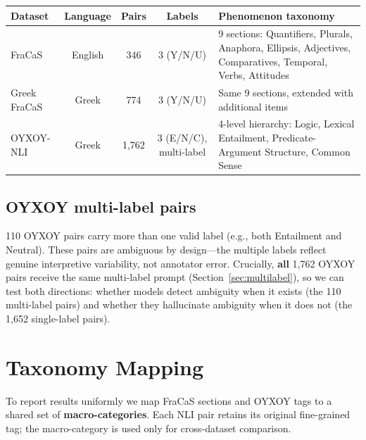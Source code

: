 \documentclass[11pt,a4paper]{article}
\begin{document}
\begin{table}[h!]
\centering\small
\begin{tabularx}{\textwidth}{l c c c X}
\toprule
\textbf{Dataset} & \textbf{Language} & \textbf{Pairs} & \textbf{Labels} & \textbf{Phenomenon taxonomy} \\
\midrule
FraCaS & English & 346 & 3 (Y/N/U) & 9 sections: Quantifiers, Plurals, Anaphora, Ellipsis, Adjectives, Comparatives, Temporal, Verbs, Attitudes \\[4pt]
Greek FraCaS & Greek & 774 & 3 (Y/N/U) & Same 9 sections, extended with additional items \\[4pt]
OYXOY-NLI & Greek & 1,762 & 3 (E/N/C), multi-label & 4-level hierarchy: Logic, Lexical Entailment, Predicate-Argument Structure, Common Sense \\
\bottomrule
\end{tabularx}
\end{table}

\subsection{OYXOY multi-label pairs}

110 OYXOY pairs carry more than one valid label (e.g., both Entailment and Neutral). These pairs are ambiguous by design---the multiple labels reflect genuine interpretive variability, not annotator error. Crucially, \textbf{all} 1,762 OYXOY pairs receive the same multi-label prompt (Section~\ref{sec:multilabel}), so we can test both directions: whether models detect ambiguity when it exists (the 110 multi-label pairs) and whether they hallucinate ambiguity when it does not (the 1,652 single-label pairs).

\section{Taxonomy Mapping}

To report results uniformly we map FraCaS sections and OYXOY tags to a shared set of \textbf{macro-categories}. Each NLI pair retains its original fine-grained tag; the macro-category is used only for cross-dataset comparison.
\end{document}
